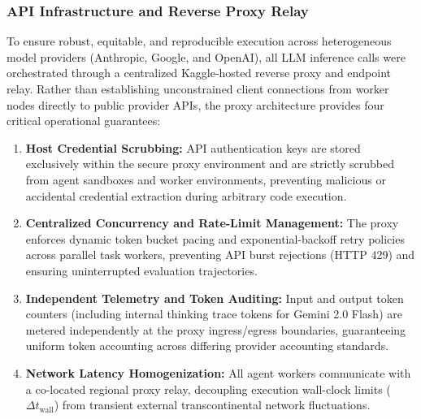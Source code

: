 \documentclass[sigconf]{acmart}
\begin{document}
\subsubsection{API Infrastructure and Reverse Proxy Relay}
To ensure robust, equitable, and reproducible execution across heterogeneous model providers (Anthropic, Google, and OpenAI), all LLM inference calls were orchestrated through a centralized Kaggle-hosted reverse proxy and endpoint relay. Rather than establishing unconstrained client connections from worker nodes directly to public provider APIs, the proxy architecture provides four critical operational guarantees:
\begin{enumerate}
    \item \textbf{Host Credential Scrubbing:} API authentication keys are stored exclusively within the secure proxy environment and are strictly scrubbed from agent sandboxes and worker environments, preventing malicious or accidental credential extraction during arbitrary code execution.
    \item \textbf{Centralized Concurrency and Rate-Limit Management:} The proxy enforces dynamic token bucket pacing and exponential-backoff retry policies across parallel task workers, preventing API burst rejections (HTTP 429) and ensuring uninterrupted evaluation trajectories.
    \item \textbf{Independent Telemetry and Token Auditing:} Input and output token counters (including internal thinking trace tokens for Gemini 2.0 Flash) are metered independently at the proxy ingress/egress boundaries, guaranteeing uniform token accounting across differing provider accounting standards.
    \item \textbf{Network Latency Homogenization:} All agent workers communicate with a co-located regional proxy relay, decoupling execution wall-clock limits ($\Delta t_{\text{wall}}$) from transient external transcontinental network fluctuations.
\end{enumerate}
\end{document}
